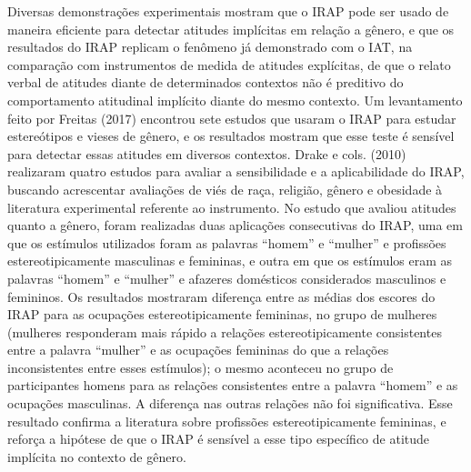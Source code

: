 Diversas demonstrações experimentais mostram que o IRAP pode ser usado de maneira eficiente para detectar atitudes implícitas em relação a gênero, e que os resultados do IRAP replicam o fenômeno já demonstrado com o IAT, na comparação com instrumentos de medida de atitudes explícitas, de que o relato verbal de atitudes diante de determinados contextos não é preditivo do comportamento atitudinal implícito diante do mesmo contexto. Um levantamento feito por Freitas (2017) encontrou sete estudos que usaram o IRAP para estudar estereótipos e vieses de gênero, e os resultados mostram que esse teste é sensível para detectar essas atitudes em diversos contextos. Drake e cols. (2010) realizaram quatro estudos para avaliar a sensibilidade e a aplicabilidade do IRAP, buscando acrescentar avaliações de viés de raça, religião, gênero e obesidade à literatura experimental referente ao instrumento. No estudo que avaliou atitudes quanto a gênero, foram realizadas duas aplicações consecutivas do IRAP, uma em que os estímulos utilizados foram as palavras ``homem'' e ``mulher'' e profissões estereotipicamente masculinas e femininas, e outra em que os estímulos eram as palavras ``homem'' e ``mulher'' e afazeres domésticos considerados masculinos e femininos. Os resultados mostraram diferença entre as médias dos escores do IRAP para as ocupações estereotipicamente femininas, no grupo de mulheres (mulheres responderam mais rápido a relações estereotipicamente consistentes entre a palavra ``mulher'' e as ocupações femininas do que a relações inconsistentes entre esses estímulos); o mesmo aconteceu no grupo de participantes homens para as relações consistentes entre a palavra ``homem'' e as ocupações masculinas. A diferença nas outras relações não foi significativa. Esse resultado confirma a literatura sobre profissões estereotipicamente femininas, e reforça a hipótese de que o IRAP é sensível a esse tipo específico de atitude implícita no contexto de gênero.

